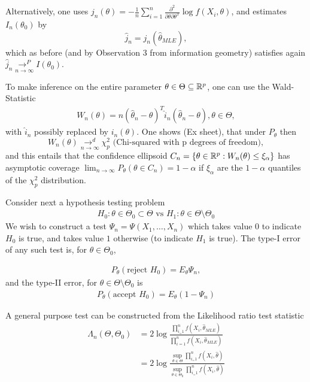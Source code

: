 \documentclass[a4paper]{article}
\begin{document}
Alternatively, one uses $j_n(\theta) = - \frac{1}{n} \sum_{i=1}^{n} \frac{\partial ^2}{\partial \theta\partial\theta^{T}} \log f(X_i, \theta) $, and estimates $I_n(\theta_0)$ by \[\hat{j}_n = j_n(\hat{\theta}_{MLE}),\] which as before (and by Observation 3 from information geometry) satisfies again $\hat{j}_n \underset{n\to \infty}{\to ^{P}} I(\theta_0)$.

To make inference on the entire parameter $\theta \in  \Theta \subseteq \mathbb{R}^{p}$, one can use the Wald-Statistic
\begin{align*}
	W_n(\theta) = n (\hat{\theta}_n - \theta)^{T} \hat{i}_n (\hat{\theta}_n - \theta), \theta \in \Theta
,\end{align*}
with $\hat{i}_n$ possibly replaced by $i_n(\theta)$. One shows (Ex sheet), that under $P_{\theta}$ then
 \[
	 W_n(\theta) \underset{n\to \infty}{\to ^{d}} \chi^2_{p} \text{ (Chi-squared with p degrees of freedom)}
,\] 
and this entails that the confidence ellipsoid $C_n = \{\theta \in \mathbb{R}^{p} : W_n(\theta) \le \xi_{\alpha}\} $ has asymptotic coverage $\lim_{n\to \infty} P_{\theta}(\theta \in C_n) = 1- \alpha$ if $\xi_{\alpha}$ are the $1- \alpha$ quantiles of the  $\chi^2_{p}$ distribution.

Consider next a hypothesis testing problem
\begin{align*}
	H_0 : \theta \in \Theta_0 \subset \Theta \text{ vs } H_1 : \theta \in \Theta\setminus\Theta_0
\end{align*}
We wish to construct a test $\Psi_n = \Psi(X_1, \ldots, X_n)$ which takes value $0$ to indicate $H_0$ is true, and takes value $1$ otherwise (to indicate $H_1$ is true). The type-I error of any such test is, for $\theta \in \Theta_0$,

\begin{align*}
	P_{\theta}(\text{reject } H_0) = E_{\theta} \Psi_n
,\end{align*}
and the type-II error, for $\theta \in \Theta\setminus\Theta_0$ is
\begin{align*}
	P_{\theta}(\text{accept } H_0) = E_{\theta}(1-\Psi_n)
\end{align*}

\begin{defn}
A general purpose test can be constructed from the Likelihood ratio test statistic
\begin{align*}
	\Lambda_n(\Theta,\Theta_0) &= 2\log \frac{\prod_{i_=1}^{n} f(X_i, \hat{\theta}_{MLE})}{\prod_{i=1}^{n}f(X_i, \hat{\theta}_{MLE})} \\
	&= 2\log \frac{\sup_{\theta \in \Theta} \prod_{i_=1}^{n} f(X_i, \hat{\theta})}{\sup_{\theta \in \Theta_0} \prod_{i_=1}^{n} f(X_i, \hat{\theta})}
\end{align*}
\end{defn}
\end{document}
